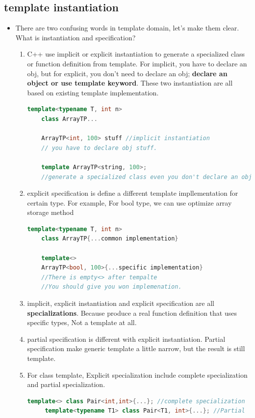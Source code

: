 \documentclass[a4paper,12pt,twoside]{book}
\begin{document}
\subsection{template instantiation}
\begin{itemize}
\item There are two confusing words in template domain, let's make them clear. What is instantiation and specification?
\begin{enumerate}
	\item C++ use implicit or explicit instantiation to generate a specialized class or function definition from template. For implicit, you have to declare an obj, but for explicit, you don't need to declare an obj; \textbf{declare an object or use template keyword}. These two instantiation are all based on existing template implementation.
	
	\begin{lstlisting}[frame=single, language=c++]
	template<typename T, int n>
	class ArrayTP...
	
	ArrayTP<int, 100> stuff //implicit instantiation
	// you have to declare obj stuff.
	
	template ArrayTP<string, 100>;
	//generate a specialized class even you don't declare an obj
	\end{lstlisting}
	\item explicit specification is define a different template impllementation for certain type. For example, For bool type, we can use optimize array storage method
		\begin{lstlisting}[frame=single, language=c++]
	template<typename T, int n>
	class ArrayTP{...common implementation}
	
	template<>
	ArrayTP<bool, 100>{...specific implementation}
	//There is empty<> after tempalte
	//You should give you won implemenation.
	\end{lstlisting}
	 \item implicit, explicit instantiation and explicit specification are all \textbf{specializations}. Because produce a real function definition that uses specific types, Not a template at all.
	 
	 \item partial specification is different with explicit instantiation. Partial specification make generic template a little narrow, but the result is still template. 
	 
	 \item For class template, Explicit specialization include complete specialization and partial specialization.
	 \begin{lstlisting}[frame=single, language=c++]
	 template<> class Pair<int,int>{...}; //complete specialization
	 template<typename T1> class Pair<T1, int>{...}; //Partial
	 \end{lstlisting}
	 

\end{enumerate}
\end{itemize}
\end{document}
